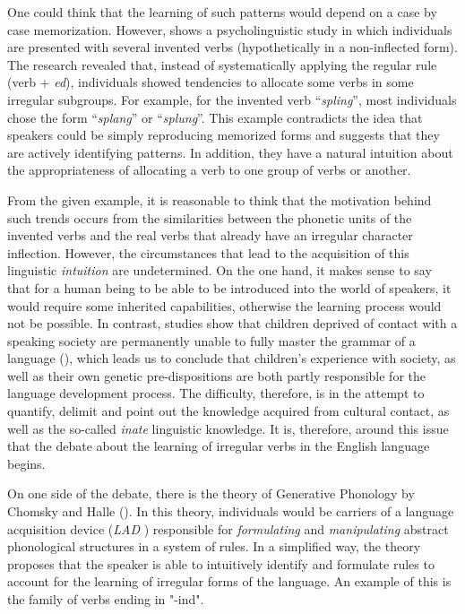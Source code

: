 One could think that the learning of such patterns would depend on a case by case memorization. However, \cite{Bybee:1983} shows a psycholinguistic study in which individuals are presented with several invented verbs (hypothetically in a non-inflected form). The research revealed that, instead of systematically applying the regular rule (verb + \textit{ed}), individuals showed tendencies to allocate some verbs in some irregular subgroups. For example, for the invented verb “\textit{spling}”, most individuals chose the form “\textit{splang}” or “\textit{splung}”. This example contradicts the idea that speakers could be simply reproducing memorized forms and suggests that they are actively identifying patterns. In addition, they have a natural intuition about the appropriateness of allocating a verb to one group of verbs or another.

From the given example, it is reasonable to think that the motivation behind such trends occurs from the similarities between the phonetic units of the invented verbs and the real verbs that already have an irregular character inflection. However, the circumstances that lead to the acquisition of this linguistic \textit{intuition} are undetermined. On the one hand, it makes sense to say that for a human being to be able to be introduced into the world of speakers, it would require some inherited capabilities, otherwise the learning process would not be possible. In contrast, studies show that children deprived of contact with a speaking society are permanently unable to fully master the grammar of a language (\cite{Pinker:languageinstinct}), which leads us to conclude that children's experience with society, as well as their own genetic pre-dispositions are both partly responsible for the language development process. The difficulty, therefore, is in the attempt to quantify, delimit and point out the knowledge acquired from cultural contact, as well as the so-called \textit{inate} linguistic knowledge. It is, therefore, around this issue that the debate about the learning of irregular verbs in the English language begins.

On one side of the debate, there is the theory of Generative Phonology by Chomsky and Halle (\citeyear{chomsky:1968}). In this theory, individuals would be carriers of a language acquisition device (\textit{LAD} ) responsible for \textit{formulating} and \textit{manipulating} abstract phonological structures in a system of rules. In a simplified way, the theory proposes that the speaker is able to intuitively identify and formulate rules to account for the learning of irregular forms of the language. An example of this is the family of verbs ending in "-ind".

